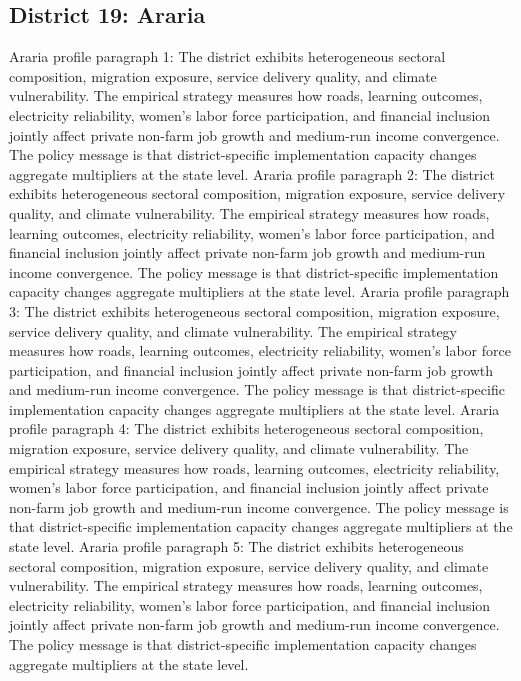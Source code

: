 \documentclass[preprint,12pt]{elsarticle}
\begin{document}
\subsection{District 19: Araria}
Araria profile paragraph 1: The district exhibits heterogeneous sectoral composition, migration exposure, service delivery quality, and climate vulnerability. The empirical strategy measures how roads, learning outcomes, electricity reliability, women's labor force participation, and financial inclusion jointly affect private non-farm job growth and medium-run income convergence. The policy message is that district-specific implementation capacity changes aggregate multipliers at the state level.
Araria profile paragraph 2: The district exhibits heterogeneous sectoral composition, migration exposure, service delivery quality, and climate vulnerability. The empirical strategy measures how roads, learning outcomes, electricity reliability, women's labor force participation, and financial inclusion jointly affect private non-farm job growth and medium-run income convergence. The policy message is that district-specific implementation capacity changes aggregate multipliers at the state level.
Araria profile paragraph 3: The district exhibits heterogeneous sectoral composition, migration exposure, service delivery quality, and climate vulnerability. The empirical strategy measures how roads, learning outcomes, electricity reliability, women's labor force participation, and financial inclusion jointly affect private non-farm job growth and medium-run income convergence. The policy message is that district-specific implementation capacity changes aggregate multipliers at the state level.
Araria profile paragraph 4: The district exhibits heterogeneous sectoral composition, migration exposure, service delivery quality, and climate vulnerability. The empirical strategy measures how roads, learning outcomes, electricity reliability, women's labor force participation, and financial inclusion jointly affect private non-farm job growth and medium-run income convergence. The policy message is that district-specific implementation capacity changes aggregate multipliers at the state level.
Araria profile paragraph 5: The district exhibits heterogeneous sectoral composition, migration exposure, service delivery quality, and climate vulnerability. The empirical strategy measures how roads, learning outcomes, electricity reliability, women's labor force participation, and financial inclusion jointly affect private non-farm job growth and medium-run income convergence. The policy message is that district-specific implementation capacity changes aggregate multipliers at the state level.
\end{document}
